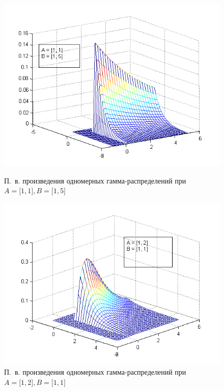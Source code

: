 \begin{figure}[h!]
  \begin{minipage}[h!]{0.47\linewidth}
    \includegraphics[width=1\linewidth]{pic/new/gamma_mesh_3}
    \caption{П.~в. произведения одномерных гамма-распределений при
      $ A = \big[1, 1\big], B = \big[ 1, 5 \big] $}
  \end{minipage}
  \hfill
  \begin{minipage}[h!]{0.47\linewidth}
    \vspace{4mm}
    \includegraphics[width=1\linewidth]{pic/new/gamma_mesh_4}
    \caption{П.~в. произведения одномерных гамма-распределений при
      $ A = \big[1, 2\big], B = \big[ 1, 1 \big] $}
  \end{minipage}
\end{figure}

